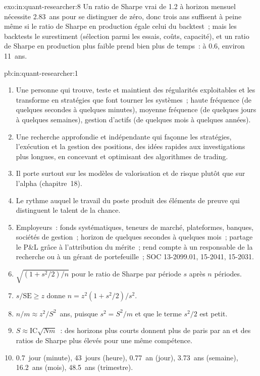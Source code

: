 \begin{solution}{exo:in:quant-researcher:8}
Un ratio de Sharpe vrai de 1.2 à horizon mensuel nécessite 2.83~ans pour se distinguer de zéro, donc trois ans suffisent à peine
même si le ratio de Sharpe en production égale celui du backtest~; mais les backtests le surestiment (sélection parmi les essais, coûts,
capacité), et un ratio de Sharpe en production plus faible prend bien plus de temps~: à 0.6, environ 11~ans.
\end{solution}

\begin{solution}{pb:in:quant-researcher:1}
\begin{enumerate}
\item Une personne qui trouve, teste et maintient des régularités exploitables et les transforme en stratégies que font tourner les systèmes~; haute fréquence
(de quelques secondes à quelques minutes), moyenne fréquence (de quelques jours à quelques semaines), gestion d'actifs (de quelques mois à quelques années).
\item Une recherche approfondie et indépendante qui façonne les stratégies, l'exécution et la gestion des positions, des idées rapides aux investigations plus longues,
en concevant et optimisant des algorithmes de trading.
\item Il porte surtout sur les modèles de valorisation et de risque plutôt que sur l'alpha (chapitre~18).
\item Le rythme auquel le travail du poste produit des éléments de preuve qui distinguent le talent de la chance.
\item Employeurs~: fonds systématiques, teneurs de marché, plateformes, banques, sociétés de gestion~; horizon de quelques secondes à quelques mois~; partage le
P\&L grâce à l'attribution du mérite~; rend compte à un responsable de la recherche ou à un gérant de portefeuille~; SOC 13-2099.01, 15-2041, 15-2031.
\item $\sqrt{(1+s^2/2)/n}$ pour le ratio de Sharpe par période $s$ après $n$ périodes.
\item $s/\mathrm{SE}\ge z$ donne $n=z^2(1+s^2/2)/s^2$.
\item $n/m\approx z^2/S^2$~ans, puisque $s^2=S^2/m$ et que le terme $s^2/2$ est petit.
\item $S\approx\mathrm{IC}\sqrt{Nm}$~: des horizons plus courts donnent plus de paris par an et des ratios de Sharpe plus élevés pour une même compétence.
\item 0.7~jour (minute), 43~jours (heure), 0.77~an (jour), 3.73~ans (semaine), 16.2~ans (mois), 48.5~ans (trimestre).

\end{enumerate}
\end{solution}
